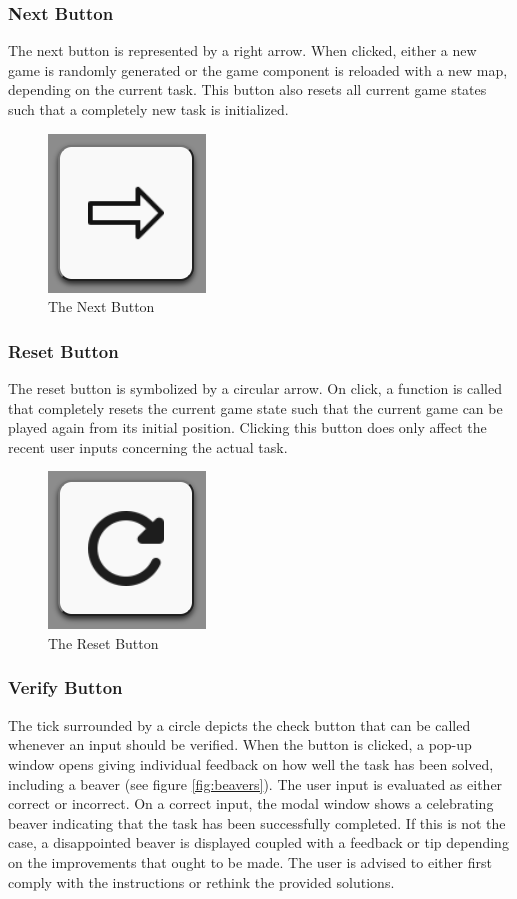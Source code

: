 \subsubsection{Next Button}
The next button is represented by a right arrow. When clicked, either a new game is randomly generated or the game component is reloaded with a new map, depending on the current task. This button also resets all current game states such that a completely new task is initialized. 

\begin{figure}[H]
    \centering
    \includegraphics[width=0.2 \columnwidth]{figures/next.png}
    \caption{The Next Button} 
    \label{fig:next} 
\end{figure}

\subsubsection{Reset Button}
The reset button is symbolized by a circular arrow. On click, a function is called that completely resets the current game state such that the current game can be played again from its initial position. Clicking this button does only affect the recent user inputs concerning the actual task.

\begin{figure}[H]
    \centering
    \includegraphics[width=0.2 \columnwidth]{figures/restart.png}
    \caption{The Reset Button} 
    \label{fig:next} 
\end{figure}

\subsubsection{Verify Button}
The tick surrounded by a circle depicts the check button that can be called whenever an input should be verified. When the button is clicked, a pop-up window opens giving individual feedback on how well the task has been solved, including a beaver (see figure \ref{fig:beavers}). The user input is evaluated as either correct or incorrect. On a correct input, the modal window shows a celebrating beaver indicating that the task has been successfully completed. If this is not the case, a disappointed beaver is displayed coupled with a feedback or tip depending on the improvements that ought to be made. The user is advised to either first comply with the instructions or rethink the provided solutions.

